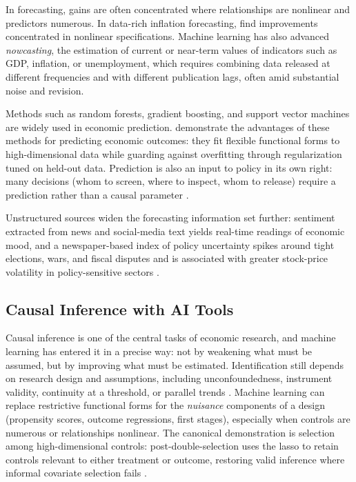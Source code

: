\documentclass[12pt]{article}
\theoremstyle{plain}
\theoremstyle{definition}
\theoremstyle{remark}
\begin{document}
In forecasting, gains are often concentrated where relationships
are nonlinear and predictors numerous. In data-rich inflation forecasting,
\citet{MedeirosEtAl2021} find improvements concentrated in nonlinear
specifications. Machine learning has also advanced \emph{nowcasting},
the estimation of current or near-term values of indicators such as GDP,
inflation, or unemployment, which requires combining data released at
different frequencies and with different publication lags, often amid
substantial noise and revision.

Methods such as random forests, gradient boosting, and
support vector machines are widely used in economic prediction.
\citet{MullainathanSpiess2017} demonstrate the advantages of these
methods for predicting economic outcomes: they fit flexible functional
forms to high-dimensional data while guarding against overfitting
through regularization tuned on held-out data. Prediction
is also an input to policy in its own right: many decisions (whom to
screen, where to inspect, whom to release) require a prediction rather
than a causal parameter \citep{KleinbergEtAl2015PredictionPolicy}.

Unstructured sources widen the forecasting information set further:
sentiment extracted from news and social-media text yields real-time
readings of economic mood, and a newspaper-based index of policy
uncertainty spikes around tight elections, wars, and fiscal disputes and
is associated with greater stock-price volatility in policy-sensitive
sectors \citep{BakerBloomDavis2016}.

\subsection{Causal Inference with AI Tools}\label{subsec:causal}

Causal inference is one of the central tasks of economic research, and
machine learning has entered it in a precise way: not by weakening what
must be assumed, but by improving what must be estimated.
Identification still depends on research design and assumptions,
including unconfoundedness, instrument validity, continuity at a
threshold, or parallel trends \citep{AtheyImbens2019}. Machine learning
can replace restrictive functional forms for the \emph{nuisance}
components of a design (propensity scores, outcome regressions, first
stages), especially when controls are numerous or relationships nonlinear. The canonical demonstration is
selection among high-dimensional controls: post-double-selection uses
the lasso to retain controls relevant to either treatment or outcome,
restoring valid inference where informal covariate selection fails
\citep{BelloniChernozhukovHansen2014}.
\end{document}
